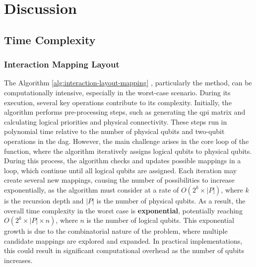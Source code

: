 \chapter{Discussion} \label{Chap5} %
\section{Time Complexity}
\subsection{Interaction Mapping Layout} %
The Algorithm \ref{alg:interaction-layout-mapping} , particularly the  method, can be computationally intensive, especially in the worst-case scenario. During its execution, several key operations contribute to its complexity. Initially, the algorithm performs pre-processing steps, such as generating the \acrfull{qpi} matrix and calculating logical priorities and physical connectivity. These steps run in polynomial time relative to the number of physical qubits and two-qubit operations in the \acrshort{dag}. However, the main challenge arises in the core loop of the  function, where the algorithm iteratively assigns logical qubits to physical qubits. \\
During this process, the algorithm checks and updates possible mappings in a  loop, which continue until all logical qubits are assigned. Each iteration may create several new mappings, causing the number of possibilities to increase exponentially, as the algorithm must consider at a rate of $O(2^k \times |P|)$, where $k$ is the recursion depth and $|P|$ is the number of physical qubits. As a result, the overall time complexity in the worst case is \textbf{exponential}, potentially reaching $O(2^k \times |P| \times n)$, where $n$ is the number of logical qubits. This exponential growth is due to the combinatorial nature of the problem, where multiple candidate mappings are explored and expanded. In practical implementations, this could result in significant computational overhead as the number of qubits increases.

